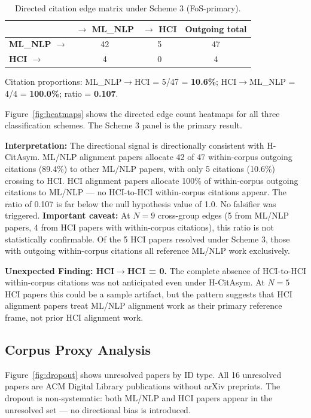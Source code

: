 \begin{table}[h]
\centering
\caption{Directed citation edge matrix under Scheme 3 (FoS-primary).}
\label{tab:matrix}
\begin{tabular}{lcc c}
\toprule
 & $\to$ ML\_NLP & $\to$ HCI & Outgoing total \\
\midrule
\textbf{ML\_NLP $\to$} & 42 & 5 & 47 \\
\textbf{HCI $\to$} & 4 & 0 & 4 \\
\bottomrule
\end{tabular}
\end{table}

Citation proportions: ML\_NLP$\to$HCI = 5/47 = \textbf{10.6\%}; HCI$\to$ML\_NLP = 4/4 = \textbf{100.0\%}; ratio = \textbf{0.107}.

Figure~\ref{fig:heatmaps} shows the directed edge count heatmaps for all three classification schemes.
The Scheme 3 panel is the primary result.

\textbf{Interpretation:} The directional signal is directionally consistent with H-CitAsym.
ML/NLP alignment papers allocate 42 of 47 within-corpus outgoing citations (89.4\%) to other ML/NLP papers, with only 5 citations (10.6\%) crossing to HCI.
HCI alignment papers allocate 100\% of within-corpus outgoing citations to ML/NLP --- no HCI-to-HCI within-corpus citations appear.
The ratio of 0.107 is far below the null hypothesis value of 1.0.
No falsifier was triggered.
\textbf{Important caveat:} At $N=9$ cross-group edges (5 from ML/NLP papers, 4 from HCI papers with within-corpus citations), this ratio is not statistically confirmable.
Of the 5 HCI papers resolved under Scheme 3, those with outgoing within-corpus citations all reference ML/NLP work exclusively.

\textbf{Unexpected Finding: HCI$\to$HCI = 0.}
The complete absence of HCI-to-HCI within-corpus citations was not anticipated even under H-CitAsym.
At $N=5$ HCI papers this could be a sample artifact, but the pattern suggests that HCI alignment papers treat ML/NLP alignment work as their primary reference frame, not prior HCI alignment work.

\subsection{Corpus Proxy Analysis}

Figure~\ref{fig:dropout} shows unresolved papers by ID type.
All 16 unresolved papers are ACM Digital Library publications without arXiv preprints.
The dropout is non-systematic: both ML/NLP and HCI papers appear in the unresolved set --- no directional bias is introduced.

